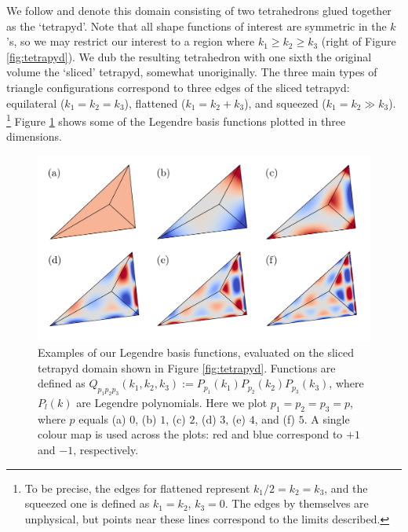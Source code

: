 We follow \cite{Fergusson2010general} and denote this domain consisting of two tetrahedrons glued together as the `tetrapyd'. Note that all shape functions of interest are symmetric in the $k$'s, so we may restrict our interest to a region where $k_1 \ge k_2 \ge k_3$ (right of Figure \ref{fig:tetrapyd}). We dub the resulting tetrahedron with one sixth the original volume the `sliced' tetrapyd, somewhat unoriginally. The three main types of triangle configurations correspond to three edges of the sliced tetrapyd: equilateral ($k_1=k_2=k_3$), flattened ($k_1 = k_2 + k_3$), and squeezed ($k_1 = k_2 \gg k_3$). \footnote{To be precise, the edges for flattened represent $k_1/2 = k_2 = k_3$, and the squeezed one is defined as $k_1=k_2$, $k_3=0$. The edges by themselves are unphysical, but points near these lines correspond to the limits described.} Figure \ref{fig:Legendre_basis_functions_3D} shows some of the Legendre basis functions plotted in three dimensions.

\begin{figure}
	\centering    
	\includegraphics[width=1.0\textwidth]{legendre_modes_3D_final.pdf}
	\caption{Examples of our Legendre basis functions, evaluated on the sliced tetrapyd domain shown in Figure \ref{fig:tetrapyd}. Functions are defined as $Q_{p_1 p_2 p_3}(k_1,k_2,k_3) := P_{p_1}(k_1) P_{p_2}(k_2) P_{p_3}(k_3)$, where $P_l(k)$ are Legendre polynomials. Here we plot $p_1 = p_2 = p_3 = p$, where $p$ equals (a) $0$, (b) $1$, (c) $2$, (d) $3$, (e) $4$, and (f) $5$. A single colour map is used across the plots: red and blue correspond to $+1$ and $-1$, respectively.}	
	\label{fig:Legendre_basis_functions_3D}
\end{figure}

